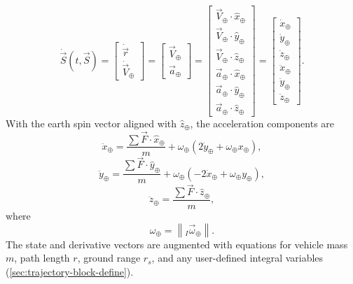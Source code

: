 \begin{equation}
  \dot{\vec S}(t,\vec S)
  =\begin{bmatrix}\dot{\vec r}\\[0.2em]\dot{\vec V}_{\oplus}\end{bmatrix}
  =\begin{bmatrix}\vec V_{\oplus}\\[0.2em]\vec a_{\oplus}\end{bmatrix}
  =\begin{bmatrix}
    \vec V_{\oplus}\mathbin{\cdot}\hat x_{\oplus}\\
    \vec V_{\oplus}\mathbin{\cdot}\hat y_{\oplus}\\
    \vec V_{\oplus}\mathbin{\cdot}\hat z_{\oplus}\\
    \vec a_{\oplus}\mathbin{\cdot}\hat x_{\oplus}\\
    \vec a_{\oplus}\mathbin{\cdot}\hat y_{\oplus}\\
    \vec a_{\oplus}\mathbin{\cdot}\hat z_{\oplus}
  \end{bmatrix}
  =\begin{bmatrix}
    \dot x_{\oplus}\\\dot y_{\oplus}\\\dot z_{\oplus}\\
    \ddot x_{\oplus}\\\ddot y_{\oplus}\\\ddot z_{\oplus}
  \end{bmatrix}.
  \label{eq:trajectory-state-derivative-vector}
\end{equation}
With the earth spin vector aligned with $\hat z_{\oplus}$, the acceleration
components are
\begin{equation}
  \ddot x_{\oplus}
  =\frac{\sum\vec F\mathbin{\cdot}\hat x_{\oplus}}{m}
   +\omega_{\oplus}
      \left(2\dot y_{\oplus}+\omega_{\oplus}x_{\oplus}\right),
  \label{eq:ecfc-x-acceleration-state-form}
\end{equation}
\begin{equation}
  \ddot y_{\oplus}
  =\frac{\sum\vec F\mathbin{\cdot}\hat y_{\oplus}}{m}
   +\omega_{\oplus}
      \left(-2\dot x_{\oplus}+\omega_{\oplus}y_{\oplus}\right),
  \label{eq:ecfc-y-acceleration-state-form}
\end{equation}
\begin{equation}
  \ddot z_{\oplus}
  =\frac{\sum\vec F\mathbin{\cdot}\hat z_{\oplus}}{m},
  \label{eq:ecfc-z-acceleration-state-form}
\end{equation}
where
\begin{equation}
  \omega_{\oplus}=\left\lVert{}_{I}\vec\omega_{\oplus}\right\rVert.
  \label{eq:earth-spin-rate-magnitude}
\end{equation}
The state and derivative vectors are augmented with equations for vehicle mass $m$,
path length $r$, ground range $r_s$, and any user-defined integral variables
(\cref{sec:trajectory-block-define}).


